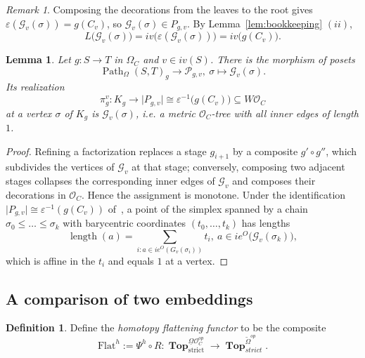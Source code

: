 \documentclass{amsart}
\newtheorem{lemma}[formula]{Lemma}
\theoremstyle{definition}
\newtheorem{definition}[formula]{Definition}
\theoremstyle{remark}
\newtheorem{remark}[formula]{Remark}
\newcommand{\eps}{\varepsilon}
\DeclareMathOperator{\Top}{\mathbf{Top}}
\DeclareMathOperator{\Path}{Path}
\DeclareMathOperator{\len}{length}
\begin{document}
	\begin{remark}\label{rem:egeq}
		Composing the decorations from the leaves to the root gives
		$\eps(\mathcal{G}_v(\sigma))=g(C_v)$, so $\mathcal{G}_v(\sigma)\in P_{g,v}$.
		By Lemma~\ref{lem:bookkeeping} $(ii)$,
		\[
			L\bigl(\mathcal{G}_v(\sigma)\bigr)=
			iv\bigl(\eps(\mathcal{G}_v(\sigma))\bigr)=
			iv\bigl(g(C_v)\bigr).
		\]
	\end{remark}		
	
	\begin{lemma}\label{lm:pi}
		Let $g\colon S\to T$ in $\Omega_C$ and $v\in iv(S)$. 
		There is the morphism of posets
		\[
			\Path_\Omega(S,T)_g\longrightarrow\mathcal P_{g,v},\ 
			\sigma\mapsto\mathcal G_v(\sigma).
		\]
		Its realization
		\[
		\pi^v_g\colon K_g\rightarrow \lvert P_{g,v}\rvert\cong
		\eps^{-1}\bigl(g(C_v)\bigr)\subseteq W\mathcal{O}_C
		\]
		at a vertex $\sigma$ of $K_g$ is $\mathcal{G}_v(\sigma)$, i.e. a metric $\mathcal{O}_{C}$-tree with all inner edges of length $1$. 
	\end{lemma}
	\begin{proof}
		Refining a factorization replaces a stage $g_{i+1}$ by a composite
		$g'\circ g''$, which subdivides the vertices of $\mathcal{G}_v$ at that stage;
		conversely, composing two adjacent stages collapses the corresponding inner
		edges of $\mathcal{G}_v$ and composes their decorations in $\mathcal{O}_C$. 
		Hence the assignment is monotone. 
		Under the identification
		$\lvert P_{g,v}\rvert\cong
		\eps^{-1}(g(C_v))$ of~\cite[Rem.~A.10]{clrrw-22}, a point of the simplex spanned by a chain
		$\sigma_0\leqslant\dots\leqslant\sigma_k$ with barycentric coordinates
		$(t_0,\dots,t_k)$ has lengths
		\begin{equation}\label{eq:affine}
			\len(a)=\sum_{i\colon a\in ie^{O}(G_v(\sigma_i))}t_i,
			\ a\in ie^{O}\bigl(\mathcal{G}_v(\sigma_k)\bigr),
		\end{equation}
		which is affine in the $t_i$ and equals $1$ at a vertex.
	\end{proof}
	
	\subsection{A comparison of two embeddings}\label{ssec:compemb}
	
	\begin{definition}\label{def:hoflat}
		Define the \emph{homotopy flattening functor} to be the composite
		\[
		\mathrm{Flat}^h:=\Psi^{h}\circ R\colon
		\Top^{\underline{\Omega}\mathcal{O}_{C}^{op}}_{\mathrm{strict}}
		\longrightarrow
		\Top^{\widetilde{\Omega}^{op}}_{strict}.
		\]
	\end{definition}
	
\end{document}
